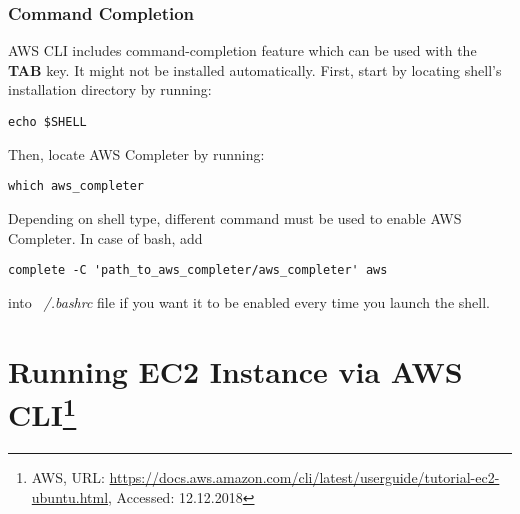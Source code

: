 \documentclass[11pt,english]{article}
\begin{document}
\subsubsection*{Command Completion}
AWS CLI includes command-completion feature which can be used with the \textbf{TAB} key. It might not be installed automatically. 
First, start by locating shell's installation directory by running:
\begin{lstlisting}
echo $SHELL
\end{lstlisting}
Then, locate AWS Completer by running:
\begin{lstlisting}
which aws_completer
\end{lstlisting}
Depending on shell type, different command must be used to enable AWS Completer. In case of bash, add
\begin{lstlisting}
complete -C 'path_to_aws_completer/aws_completer' aws
\end{lstlisting}
into \textit{~/.bashrc} file if you want it to be enabled every time you launch the shell.
 	
\section{Running EC2 Instance via AWS CLI\footnote{AWS, URL: \url{https://docs.aws.amazon.com/cli/latest/userguide/tutorial-ec2-ubuntu.html}, Accessed: 12.12.2018}}
\end{document}
